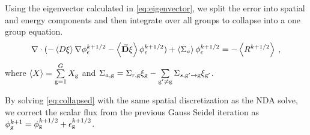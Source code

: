   Using the eigenvector calculated in \eqref{eq:eigenvector}, we split the error into spatial and energy components and then integrate over all groups to collapse into a one group equation.
  \begin{equation}
  \nabla\cdot(-\left< D \xi \right> \nabla \phi_{\epsilon}^{k+1/2} - \left<\vec{\bf D} \xi
  \right> \phi_{\epsilon}^{k+1/2}) + \left< \Sigma_{a} \right> \phi_{\epsilon}^{k+1/2} = - \left< R^{k+1/2} \right> \:,\label{eq:collapsed}
  \end{equation}
  where $\left< X \right> = \sum\limits_{\mathrm{g} = 1}^G X_{\mathrm{g}} $ and $\Sigma_{a,\mathrm{g}}  = \Sigma_{r,\mathrm{g}}\xi_{\mathrm{g}} - \sum\limits_{{\mathrm{g}'}\neq\mathrm{g}} \Sigma_{s,\mathrm{g}'\rightarrow \mathrm{g}} \xi_{\mathrm{g}'}$.
  \par
  By solving \eqref{eq:collapsed} with the same spatial discretization as the NDA solve, we correct the scalar flux from the previous Gauss Seidel iteration as $\phi_{\mathrm{g}}^{k+1} = \phi_{\mathrm{g}}^{k+1/2} + \epsilon_{\mathrm{g}}^{k+1/2}$.